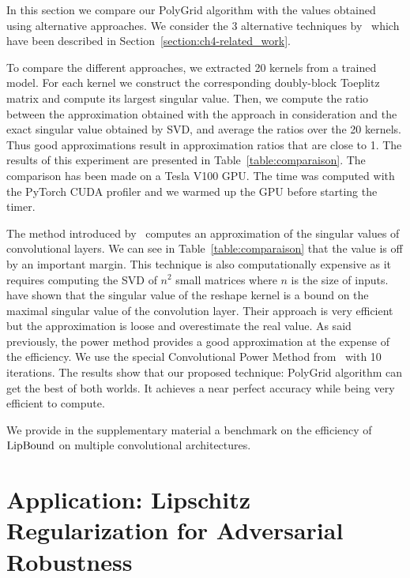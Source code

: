 In this section we compare our PolyGrid algorithm with the values obtained using alternative approaches.
We consider the 3 alternative techniques by~\citet{sedghi2018iclr,singla2019bounding,farnia2018generalizable} which have been described in Section~\ref{section:ch4-related_work}. 

To compare the different approaches, we extracted 20 kernels from a trained model.
For each kernel we construct the corresponding doubly-block Toeplitz matrix and compute its largest singular value.
Then, we compute the ratio between the approximation obtained with the approach in consideration and the exact singular value obtained by SVD, and average the ratios over the 20 kernels.
Thus good approximations result in approximation ratios that are close to 1.
The results of this experiment are presented in Table~\ref{table:comparaison}.
The comparison has been made on a Tesla V100 GPU. 
The time was computed with the PyTorch CUDA profiler and we warmed up the GPU before starting the timer.

The method introduced by~\citet{sedghi2018iclr} computes an approximation of the singular values of convolutional layers.
We can see in Table~\ref{table:comparaison} that the value is off by an important margin.
This technique is also computationally expensive as it requires computing the SVD of $n^2$ small matrices where $n$ is the size of inputs.
\citet{singla2019bounding} have shown that the singular value of the reshape kernel is a bound on the maximal singular value of the convolution layer.
Their approach is very efficient but the approximation is loose and overestimate the real value.
As said previously, the power method provides a good approximation at the expense of the efficiency.
We use the special Convolutional Power Method from~\citet{farnia2018generalizable} with 10 iterations.
The results show that our proposed technique: PolyGrid algorithm can get the best of both worlds.
It achieves a near perfect accuracy while being very efficient to compute. 

We provide in the supplementary material a benchmark on the efficiency of $\operatorname{LipBound}$ on multiple convolutional architectures. 


\section{Application: Lipschitz Regularization for Adversarial Robustness}
\label{section:experiments}

